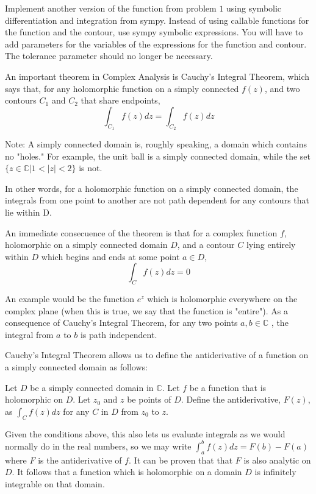 \begin{problem}
Implement another version of the function from problem $1$ using symbolic differentiation and integration from sympy. Instead of using callable functions for the function and the contour, use sympy symbolic expressions. You will have to add parameters for the variables of the expressions for the function and contour. The tolerance parameter should no longer be necessary.
\end{problem}

An important theorem in Complex Analysis is Cauchy's Integral Theorem, which says that, for any holomorphic function on a simply connected  $f(z)$, and two contours $C_1$ and $C_2$ that share endpoints, $$\int_{C_1}f(z)dz = \int_{C_2}f(z)dz$$

Note: A simply connected domain is, roughly speaking, a domain which contains no "holes." For example, the unit ball is a simply connected domain, while the set $\lbrace z\in \mathbb{C} | 1<|z|<2 \rbrace$ is not. 

In other words, for a holomorphic function on a simply connected domain, the integrals from one point to another are not path dependent for any contours that lie within D.

An immediate consecuence of the theorem is that for a complex function $f$, holomorphic on a simply connected domain $D$, and a contour $C$ lying entirely within $D$ which begins and ends at some point $a\in D$, $$\int_C f(z)dz=0$$

An example would be the function $e^z$ which is holomorphic everywhere on the complex plane (when this is true, we say that the function is "entire"). As a consequence of Cauchy's Integral Theorem, for any two points $a,b\in \mathbb{C}$ , the integral from $a$ to $b$ is path independent.

Cauchy's Integral Theorem allows us to define the antiderivative of a function on a simply connected domain as follows:

Let $D$ be a simply connected domain in $\mathbb{C}$. Let $f$ be a function that is holomorphic on $D$. Let $z_0$ and $z$ be points of $D$. Define the antiderivative, $F(z)$, as $\int_C f(z)dz$ for any $C$ in $D$ from $z_0$ to $z$.

Given the conditions above, this also lets us evaluate integrals as we would normally do in the real numbers, so we may write $\int_a^b f(z)dz=F(b)-F(a)$ where $F$ is the antiderivative of $f$. It can be proven that that $F$ is also analytic on $D$. It follows that a function which is holomorphic on a domain $D$ is infinitely integrable on that domain.

